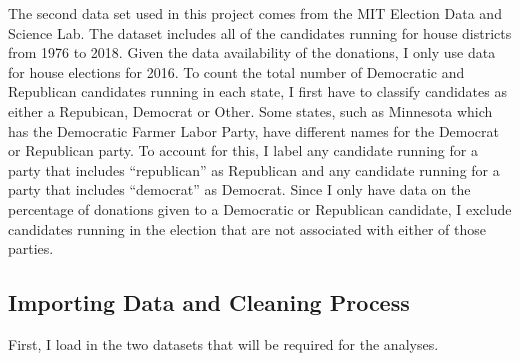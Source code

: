 \documentclass[]{article}
\begin{document}
The second data set used in this project comes from the MIT Election
Data and Science Lab. The dataset includes all of the candidates running
for house districts from 1976 to 2018. Given the data availability of
the donations, I only use data for house elections for 2016. To count
the total number of Democratic and Republican candidates running in each
state, I first have to classify candidates as either a Repubican,
Democrat or Other. Some states, such as Minnesota which has the
Democratic Farmer Labor Party, have different names for the Democrat or
Republican party. To account for this, I label any candidate running for
a party that includes ``republican'' as Republican and any candidate
running for a party that includes ``democrat'' as Democrat. Since I only
have data on the percentage of donations given to a Democratic or
Republican candidate, I exclude candidates running in the election that
are not associated with either of those parties.

\subsection{Importing Data and Cleaning
Process}\label{importing-data-and-cleaning-process}

First, I load in the two datasets that will be required for the
analyses.
\end{document}
